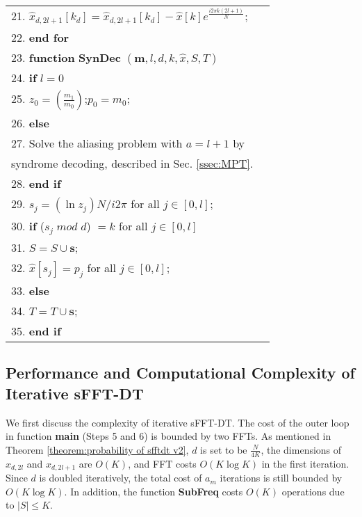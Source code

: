 \documentclass[journal,onecolumn,11pt]{IEEEtran}
\begin{document}
\begin{algorithm}[!htb]
\begin{tabular}[t]{p{17.7cm}l}
21. \quad \quad $   \hat{x}_{d,2l+1}[k_{d}]=\hat{x}_{d,2l+1}[k_{d}]- \hat{x}[k]e^{\frac{i2\pi k(2l+1)}{N}} $;\\
22. \quad \textbf{end for}\\
23. \textbf{function} \textbf{SynDec} $(\bm{m},l,d,k,\hat{x},S,T)$\\
24. \quad \textbf{if} $l=0$\\
25. \quad \quad $  z_{0}= ( \frac{m_{1}}{m_{0}})$;\;\;$p_{0}= m_{0}$;\\
26. \quad \textbf{else} \\
27. \quad \quad  Solve the aliasing problem with $a=l+1$ by \\
    \quad \quad \quad \;\;syndrome decoding, described in Sec. \ref{ssec:MPT}. \\
28. \quad \textbf{end if} \\
29. \quad $s_{j}= (\ln z_{j})N/i2\pi $ for all $j \in [0,l] $; \\
30. \quad  \textbf{if} ($s_{j}\;mod\;d$) $ = k$ for all $j \in [0,l] $\\
31. \quad \quad $S=S\cup \bm{s}$;\\
32. \quad \quad $\hat{x}[s_{j}]=p_{j}$ for all $j \in [0,l]$;\\
33. \quad \textbf{else} \\
34. \quad \quad  $T=T\cup \bm{s}$;\\
35. \quad  \textbf{end if}\\
\hline
\end{tabular}
\end{algorithm}
\normalsize

\subsection{Performance and Computational Complexity of Iterative sFFT-DT}\label{ssec:conv_analysis}
We first discuss the complexity of iterative sFFT-DT.
The cost of the outer loop in function \textbf{main} (Steps 5 and 6) is bounded by two FFTs.
As mentioned in Theorem \ref{theorem:probability of sfftdt v2}, $d$ is set to be $  \frac{N}{4K}$, the dimensions of $x_{d,2l}$ and $x_{d,2l+1}$ are $O(K)$, and FFT costs $O(K \log K)$ in the first iteration.
Since $d$ is doubled iteratively, the total cost of  $a_m$ iterations is still bounded by $O(K \log K)$.
In addition, the function \textbf{SubFreq} costs $O(K)$ operations due to $|S|\leq K$.
\end{document}

